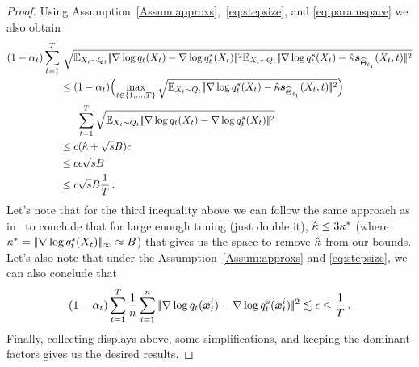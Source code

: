 \begin{proof}
Using Assumption~\ref{Assum:approxs},~\eqref{eq:stepsize}, and \eqref{eq:paramspace} we also obtain 
\begin{align*}
   (1-\alpha_t)  \sum_{t=1}^{T} &~\sqrt{\E_{X_t\sim Q_t}\norm{\nabla\log \Fdd_t(X_t)-\nabla\log \Fdds_t(X_t)}^2\E_{X_t\sim Q_t}\norm{\nabla\log \Fdds_t(X_t)-\scaleh\scorefh(X_t,t)}^2} \\
   &\le (1-\alpha_t)   \Bigl(\max_{t\in \{1,\dots,T\}} \sqrt{\E_{X_t\sim Q_t}\norm{\nabla\log \Fdds_t(X_t)-\scaleh\scorefh(X_t,t)}^2}\Bigr)\\
   &~~~~~\sum_{t=1}^{T} \sqrt{\E_{X_t\sim Q_t}\norm{\nabla\log \Fdd_t(X_t)-\nabla\log \Fdds_t(X_t)}^2}\\
   &\le \COr(\scaleh+\sqrt{s}\DerBound)\Esparsity \\
   &\le \COr\Esparsity \sqrt{s}\DerBound\\
   &\le \COr\sqrt{s}\DerBound\frac{1}{T}\,.
\end{align*}
Let's note that for the third inequality above we can follow the same approach as in~\citet[Page~155]{taheri2021} to conclude that for large enough tuning (just double it), $\hat{\kappa}\le 3\kappa^*$ (where $\kappa^*=|\!|\nabla\log q^s_t(X_t)|\!|_{\infty}\approx B$) that gives us the space to remove $\hat{\kappa}$ from our bounds. 
Let's also note that under the Assumption~\ref{Assum:approxs} and \eqref{eq:stepsize}, we can also conclude that 
\begin{align*}
    (1-\alpha_t)  \sum_{t=1}^{T} \frac{1}{n} \sum_{i=1}^{n}  |\!|\nabla \log q_t(\textcolor{black}{\boldsymbol{x}}_t^i)-\nabla\log q^s_t(\textcolor{black}{\boldsymbol{x}}_t^i)|\!|^2 \lesssim \epsilon \le \frac{1}{T}\,.
\end{align*}
Finally, collecting   displays above, some simplifications, and  keeping the dominant factors gives us the desired results. 
\end{proof}



